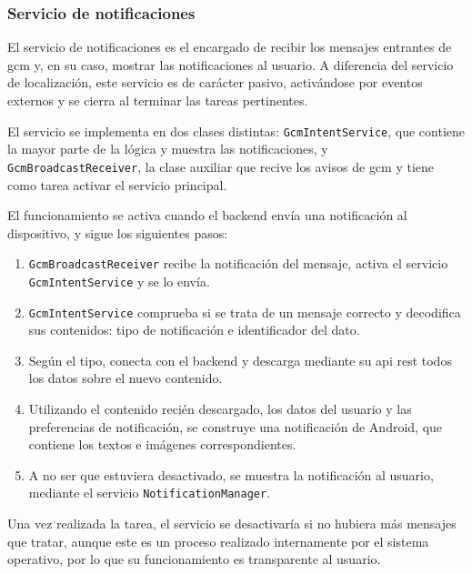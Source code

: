 \documentclass[main]{subfiles}
\begin{document}
\subsubsection{Servicio de notificaciones}

El servicio de notificaciones es el encargado de recibir los mensajes entrantes de \gls{gcm} y, en su caso, mostrar las notificaciones al usuario. A diferencia del servicio de localización, este servicio es de carácter pasivo, activándose por eventos externos y se cierra al terminar las tareas pertinentes.

El servicio se implementa en dos clases distintas: \texttt{GcmIntentService}, que contiene la mayor parte de la lógica y muestra las notificaciones, y \texttt{GcmBroadcastReceiver}, la clase auxiliar que recive los avisos de \gls{gcm} y tiene como tarea activar el servicio principal.

El funcionamiento se activa cuando el \gls{backend} envía una notificación al dispositivo, y sigue los siguientes pasos:

\begin{enumerate}
  \item \texttt{GcmBroadcastReceiver} recibe la notificación del mensaje, activa el servicio \texttt{GcmIntentService} y se lo envía.
  \item \texttt{GcmIntentService} comprueba si se trata de un mensaje correcto y decodifica sus contenidos: tipo de notificación e identificador del dato.
  \item Según el tipo, conecta con el \gls{backend} y descarga mediante su \gls{api} \gls{rest} todos los datos sobre el nuevo contenido.
  \item Utilizando el contenido recién descargado, los datos del usuario y las preferencias de notificación, se construye una notificación de Android, que contiene los textos e imágenes correspondientes.
  \item A no ser que estuviera desactivado, se muestra la notificación al usuario, mediante el servicio \texttt{NotificationManager}.
\end{enumerate}

Una vez realizada la tarea, el servicio se desactivaría si no hubiera más mensajes que tratar, aunque este es un proceso realizado internamente por el sistema operativo, por lo que su funcionamiento es transparente al usuario.
\end{document}
